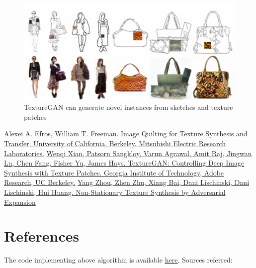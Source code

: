 \documentclass[12pt,a4paper]{report}
\begin{document}
\begin{figure}[H]
  \centering
  \includegraphics[scale = 0.33]{pics/examples.png}
  \caption{TextureGAN can generate novel instances from sketches and texture patches}
  \label{fig:examples}
\end{figure}

\newpage
{}

\begin{thebibliography}{99}
 \href{https://people.eecs.berkeley.edu/~efros/research/quilting/quilting.pdf}{Alexei A. Efros, William T. Freeman. Image Quilting for Texture Synthesis and Transfer. University of California, Berkeley. Mitsubishi Electric Research Laboratories.}
 \href{https://arxiv.org/pdf/1706.02823v3.pdf}{Wenqi Xian, Patsorn Sangkloy, Varun Agrawal, Amit Raj, Jingwan Lu, Chen Fang, Fisher Yu, James Hays. TextureGAN: Controlling Deep Image Synthesis with Texture Patches. Georgia Institute of Technology, Adobe Research, UC Berkeley.}
 \href{https://arxiv.org/pdf/1805.04487v1.pdf}{Yang Zhou, Zhen Zhu, Xiang Bai, Dani Lischinski, Dani Lischinski, Hui Huang. Non-Stationary Texture Synthesis by Adversarial Expansion}
\end{thebibliography}

\newpage 
{}
\chapter*{References}
{\large The code implementing above algorithm is available \href{https://github.com/aayushgoyal443/COD310-Texture-Synthesis}{\underline{here}}. Sources referred:}
\end{document}
